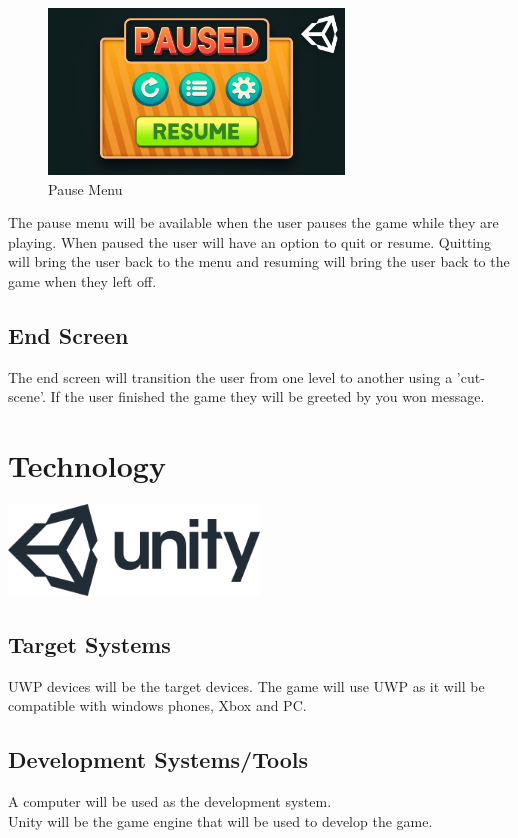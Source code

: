 \documentclass[a4paper]{scrreprt}
\begin{document}
\begin{figure}[H]
\centering
\includegraphics[width=0.70\textwidth]{pause}
\caption{\label{fig:art} Pause Menu}
\end{figure}

The pause menu will be available when the user pauses the game while they are playing. When paused the user will have an option to quit or resume.
Quitting will bring the user back to the menu and resuming will bring the user back to the game when they left off.

\section{End Screen}

The end screen will transition the user from one level to another using a 'cut-scene'. If the user finished the game they will be greeted by you won message.


\chapter{Technology}

\includegraphics[width=0.50\textwidth]{Unity}

\section{Target Systems}

UWP devices will be the target devices. The game will use UWP as it will be compatible with windows phones, Xbox and PC.

\section{Development Systems/Tools}

A computer will be used as the development system. \\
Unity will be the game engine that will be used to develop the game. \\
\end{document}

